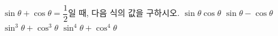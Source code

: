 $\sin\theta+\cos\theta=\dfrac{1}{2}$일 때, 다음 식의 값을 구하시오. \cond{$\sin\theta>\cos\theta$}
 $\sin\theta\cos\theta$
 $\sin\theta-\cos\theta$
 $\sin^3\theta+\cos^3\theta$
 $\sin^4\theta+\cos^4\theta$
